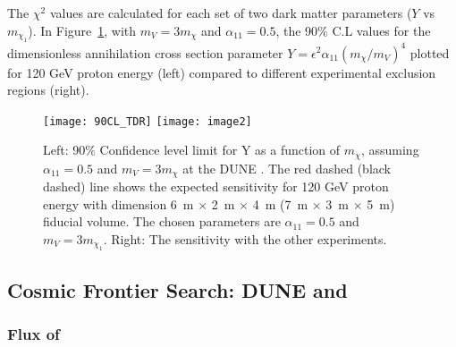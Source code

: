 The $\chi^{2}$ values are calculated for each set of two dark matter parameters ($Y$ vs $m_{\chi_1}$).
In Figure~\ref{fig:chisq}, with $m_{V} = 3m_{\chi}$ and $\alpha_{11}=0.5$,  the 90$\%$ C.L  values for the dimensionless  annihilation
cross section parameter $Y = \epsilon^{2}\alpha_{11} (m_{\chi}/m_{V})^4$ plotted for 120 GeV proton energy (left) compared to different experimental exclusion regions (right).
 \begin{figure}[t]
 \centering
 \texttt{[image: 90CL\_TDR]}
 \texttt{[image: image2]}
 \caption[90$\%$ Confidence level limit for Y as a function of $m_{\chi}$ at ND]{\label{fig:chisq} Left: 90$\%$ Confidence level limit for Y as a function of $m_{\chi}$, assuming $\alpha_{11}=0.5$ and $m_{V} = 3m_{\chi}$ at the DUNE . 
The red dashed (black dashed) line shows the expected sensitivity for 120 GeV proton energy with  dimension  \SI{6}{m} $\times$ \SI{2}{m} $\times$ \SI{4}{m}  (\SI{7}{m} $\times$ \SI{3}{m} $\times$ \SI{5}{m}) fiducial volume. 
The chosen parameters are $\alpha_{11}=0.5$ and $m_{V}= 3m_{\chi_1}$.
Right: The sensitivity with the other experiments.}
 \end{figure}

\subsection{Cosmic Frontier Search: DUNE  and  \label{sec:FD}}

\subsubsection{Flux of  \label{sec:flux}}


